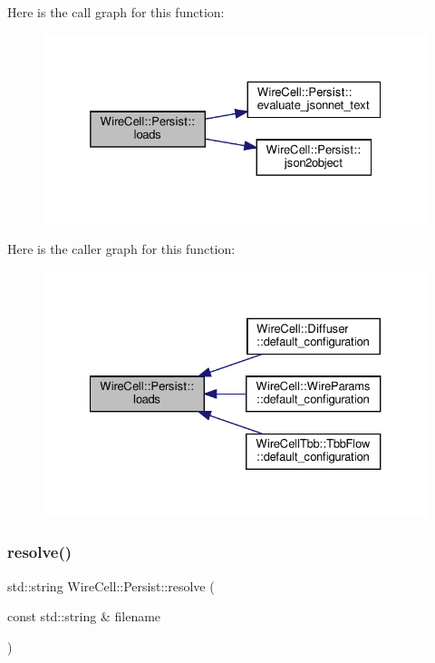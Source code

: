 Here is the call graph for this function\+:
\nopagebreak
\begin{figure}[H]
\begin{center}
\leavevmode
\includegraphics[width=325pt]{namespace_wire_cell_1_1_persist_adce7b2acfe82eb122ed5d06f261e155e_cgraph}
\end{center}
\end{figure}
Here is the caller graph for this function\+:
\nopagebreak
\begin{figure}[H]
\begin{center}
\leavevmode
\includegraphics[width=327pt]{namespace_wire_cell_1_1_persist_adce7b2acfe82eb122ed5d06f261e155e_icgraph}
\end{center}
\end{figure}
\mbox{\label{namespace_wire_cell_1_1_persist_a222a8187746d148cdc44b0b43b109e53}} 
\subsubsection{\texorpdfstring{resolve()}{resolve()}}
{\footnotesize\ttfamily std\+::string Wire\+Cell\+::\+Persist\+::resolve (\begin{DoxyParamCaption}\item[{const std\+::string \&}]{filename }\end{DoxyParamCaption})}


